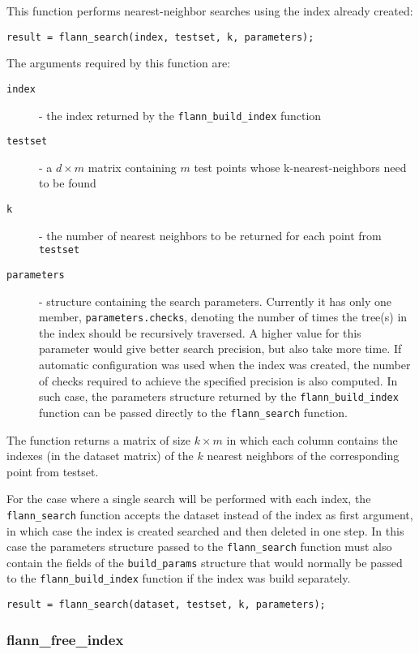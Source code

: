 \documentclass[letter,10pt]{article}
\begin{document}
This function performs nearest-neighbor searches using the index already
created:
\begin{Verbatim}
result = flann_search(index, testset, k, parameters);
\end{Verbatim}

The arguments required by this function are:
\begin{description}
\item[\texttt{index}] - the index returned by the
\texttt{flann\_build\_index} function
\item[\texttt{testset}] - a $d \times m$ matrix containing $m$ test points
whose k-nearest-neighbors need to be found
\item[\texttt{k}] - the number of nearest neighbors to be returned for each
point from \texttt{testset}
\item[\texttt{parameters}] - structure containing the search parameters.
Currently it has only one member, \texttt{parameters.checks}, denoting the
number of times the tree(s) in the index should be recursively traversed. A
higher value for this parameter would give better search precision, but
also take more time. If automatic configuration was used when the
index was created, the number of checks required to achieve the specified
precision is also computed. In such case, the parameters structure returned
by the \texttt{flann\_build\_index} function can be passed directly to the
\texttt{flann\_search} function.
\end{description}

The function returns a matrix of size $k \times m$ in which each column contains the indexes (in the dataset matrix) of the $k$ nearest neighbors of the corresponding point from testset.

For the case where a single search will be performed with each index, the
\texttt{flann\_search} function accepts the dataset instead of the index as
first argument, in which case the index is created searched and then
deleted in one step. In this case the parameters structure passed to the
\texttt{flann\_search} function must also contain the fields of the
\texttt{build\_params} structure that would normally be passed to the
\texttt{flann\_build\_index} function if the index was build separately.
\begin{Verbatim}
result = flann_search(dataset, testset, k, parameters);
\end{Verbatim}


\subsubsection{flann\_free\_index}
\end{document}
